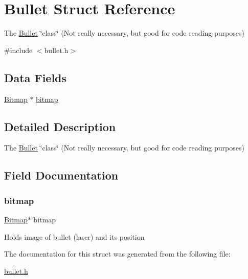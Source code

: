 \hypertarget{struct_bullet}{}\section{Bullet Struct Reference}
\label{struct_bullet}


The \hyperlink{struct_bullet}{Bullet} \char`\"{}class\char`\"{} (Not really necessary, but good for code reading purposes)  




{\ttfamily \#include $<$bullet.\+h$>$}

\subsection*{Data Fields}
\begin{DoxyCompactItemize}
\item 
\hyperlink{struct_bitmap}{Bitmap} $\ast$ \hyperlink{struct_bullet_a00c870e2cedff0b231b1c8ad85019f66}{bitmap}
\end{DoxyCompactItemize}


\subsection{Detailed Description}
The \hyperlink{struct_bullet}{Bullet} \char`\"{}class\char`\"{} (Not really necessary, but good for code reading purposes) 

\subsection{Field Documentation}
\hypertarget{struct_bullet_a00c870e2cedff0b231b1c8ad85019f66}{}\label{struct_bullet_a00c870e2cedff0b231b1c8ad85019f66} 
\subsubsection{\texorpdfstring{bitmap}{bitmap}}
{\footnotesize\ttfamily \hyperlink{struct_bitmap}{Bitmap}$\ast$ bitmap}

Holds image of bullet (laser) and its position 

The documentation for this struct was generated from the following file\+:\begin{DoxyCompactItemize}
\item 
\hyperlink{bullet_8h}{bullet.\+h}\end{DoxyCompactItemize}
